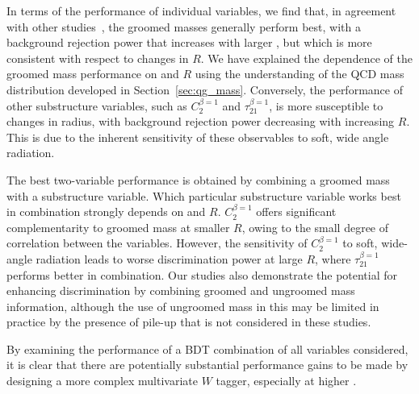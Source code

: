 In terms of the performance of individual variables, we find that, in
agreement with other studies~\cite{ATL-PHYS-PUB-2014-004}, the groomed masses generally perform best, 
with a background rejection
power that increases with larger \pT, but which is more consistent
with respect to changes in $R$. We have explained the dependence of the
groomed mass performance on \pT and $R$ using the understanding of the QCD mass distribution
developed in Section~\ref{sec:qg_mass}. Conversely, the performance of other
substructure variables, such as $C_2^{\beta=1}$ and
$\tau_{21}^{\beta=1}$, is more susceptible to changes in radius, with
background rejection power decreasing with increasing $R$. This is due
to the inherent sensitivity of these observables to soft, wide angle radiation.

The best two-variable performance is obtained by combining a groomed
mass with a substructure variable. Which particular substructure
variable works best in combination  strongly depends on \pT and
$R$. $C_2^{\beta=1}$ offers significant complementarity to groomed mass
at smaller $R$, owing to the small degree of correlation between the
variables. However, the sensitivity of $C_2^{\beta=1}$ to soft,
wide-angle radiation leads to worse discrimination power at large $R$,
where $\tau_{21}^{\beta=1}$ performs better in combination. Our
studies also demonstrate the potential for enhancing discrimination by
combining groomed and ungroomed mass information, although the use of
ungroomed mass in this may be limited in practice by the presence of
pile-up that is not considered in these studies.

By examining the performance of a BDT combination of all  variables
considered, it is clear that there are potentially substantial performance gains to be made by designing a more
complex multivariate $W$ tagger, especially at higher \pT.




